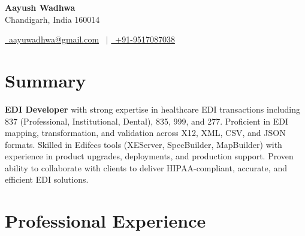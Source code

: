 \documentclass[a4paper,12pt]{article}
\begin{document}
\pagestyle{empty}

\begin{center}
    {\Huge \textbf{Aayush Wadhwa}} \\[5pt]
    Chandigarh, India 160014
\end{center}

\begin{center}
    \href{mailto:aayuwadhwa@gmail.com}{\raisebox{-0.05\height}\faEnvelope\ aayuwadhwa@gmail.com} \, $|$ 
    \href{tel:+919517087038}{\raisebox{-0.05\height}\faMobile\ +91-9517087038}
\end{center}

\section{Summary}
\textbf{EDI Developer} with strong expertise in healthcare EDI transactions including 837 (Professional, Institutional, Dental), 835, 999, and 277. Proficient in EDI mapping, transformation, and validation across X12, XML, CSV, and JSON formats. Skilled in Edifecs tools (XEServer, SpecBuilder, MapBuilder) with experience in product upgrades, deployments, and production support. Proven ability to collaborate with clients to deliver HIPAA-compliant, accurate, and efficient EDI solutions.

\section{Professional Experience}
\end{document}
